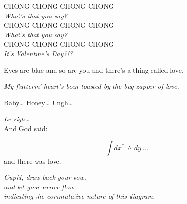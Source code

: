 \documentclass[12pt]{article}
\begin{document}
\pagebreak

\mbox{\hspace{0 cm}} CHONG CHONG CHONG CHONG \\

\vspace{-0.75 cm}
\mbox{\hspace{5.4 cm}} {\it What's that you say?} \\

\vspace{-0.75 cm}
\mbox{\hspace{0.8 cm}} CHONG CHONG CHONG CHONG \\

\vspace{-0.75 cm}
\mbox{\hspace{6.2 cm}} {\it What's that you say?} \\

\vspace{-0.75 cm}
\mbox{\hspace{1.6 cm}} CHONG CHONG CHONG CHONG \\

\vspace{-0.75 cm}
\mbox{\hspace{7.0 cm}} {\it It's Valentine's Day?!?} \\

\vfill

Eyes are blue and so are you and there's a thing called love.

\setlength{\parskip}{0.75 cm}

\vfill

{\it My flutterin' heart's been toasted by the bug-zapper of love.}

\vfill

Baby\ldots \mbox{\hspace{0.75 cm}} Honey\ldots \mbox{\hspace{0.75 cm}} Ungh\ldots

\vfill

{\it Le sigh\ldots} \\
\mbox{\hspace{6 cm}} And God said:

\vspace{-0.55 cm}
\[\int dx^* \, \wedge \, dy \, \mbox{\ldots} \]
\mbox{\hspace{8 cm}} and there was love.

{\it Cupid, draw back your bow, \\
and let your arrow flow, \\
indicating the commutative nature of this diagram.}
\end{document}

